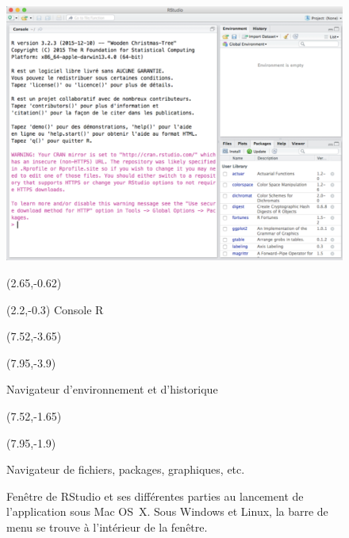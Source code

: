 \begin{figure}[t]
  \includegraphics{rstudiowindow-screenshot}
  \vspace{0.5\TPVertModule}

  \begin{textblock}{0.5}(2.65,-0.62)
    \large\faLongArrowDown
  \end{textblock}
  \begin{textblock}{2}(2.2,-0.3)
    \footnotesize\sffamily Console R
  \end{textblock}

  \begin{textblock}{1}(7.52,-3.65)
    \large\faLongArrowRight
  \end{textblock}
  \begin{textblock}{2.2}(7.95,-3.9)
    \footnotesize\sffamily\raggedright Navigateur d'environnement et d'historique
  \end{textblock}

  \begin{textblock}{1}(7.52,-1.65)
    \large\faLongArrowRight
  \end{textblock}
  \begin{textblock}{2.2}(7.95,-1.9)
    \footnotesize\sffamily\raggedright Navigateur de fichiers, packages, graphiques, etc.
  \end{textblock}
  \caption{Fenêtre de RStudio et ses différentes parties au lancement
    de l'application sous Mac OS~X. Sous Windows et Linux, la barre de
    menu se trouve à l'intérieur de la fenêtre.}
  \label{fig:rstudio:rstudiowindow}
\end{figure}


